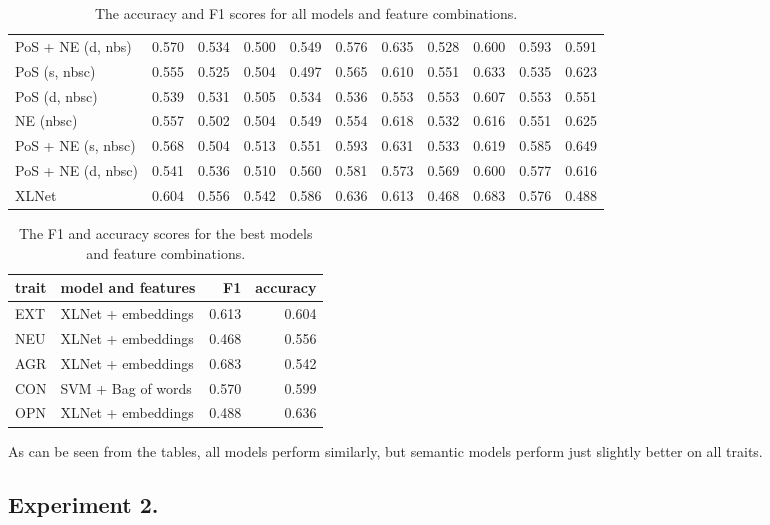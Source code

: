 \documentclass[10pt, a4paper]{article}
\begin{document}
\begin{table}
\begin{center}
\begin{tabular}{lrrrrrrrrrr}
     PoS + NE (d, nbs) &  0.570 &  0.534 &  0.500 &  0.549 &  0.576 &  0.635 &  0.528 &  0.600 &  0.593 &  0.591\\
         PoS (s, nbsc) &  0.555 &  0.525 &  0.504 &  0.497 &  0.565 &  0.610 &  0.551 &  0.633 &  0.535 &  0.623\\
         PoS (d, nbsc) &  0.539 &  0.531 &  0.505 &  0.534 &  0.536 &  0.553 &  0.553 &  0.607 &  0.553 &  0.551\\
             NE (nbsc) &  0.557 &  0.502 &  0.504 &  0.549 &  0.554 &  0.618 &  0.532 &  0.616 &  0.551 &  0.625\\
    PoS + NE (s, nbsc) &  0.568 &  0.504 &  0.513 &  0.551 &  0.593 &  0.631 &  0.533 &  0.619 &  0.585 &  0.649\\
    PoS + NE (d, nbsc) &  0.541 &  0.536 &  0.510 &  0.560 &  0.581 &  0.573 &  0.569 &  0.600 &  0.577 &  0.616\\
                 XLNet &  0.604 &  0.556 &  0.542 &  0.586 &  0.636 &  0.613 &  0.468 &  0.683 &  0.576 &  0.488\\
    \bottomrule
  \end{tabular}
  \end{center}
  \caption{The accuracy and F1 scores for all models and feature combinations.}
  \label{table:acc-f1}
\end{table}

\begin{table}[H]
  \begin{tabular}{llrr}
    \toprule
    trait & model and features &     F1 & accuracy \\
    \midrule
    EXT &   XLNet + embeddings &  0.613 &  0.604 \\
    NEU &   XLNet + embeddings &  0.468 &  0.556 \\
    AGR &   XLNet + embeddings &  0.683 &  0.542 \\
    CON &   SVM + Bag of words &  0.570 &  0.599 \\
    OPN &   XLNet + embeddings &  0.488 &  0.636 \\
    \bottomrule
  \end{tabular}
  \caption{The F1 and accuracy scores for the best models and feature combinations.}
  \label{table:best}
\end{table}

As can be seen from the tables, all models perform similarly, but semantic models perform just slightly better on all traits.

\subsection{Experiment 2.}
\end{document}

